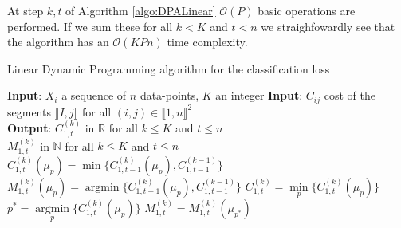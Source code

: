 \documentclass[article,10pt]{llncs}
\begin{document}
At step $k, t$ of Algorithm \ref{algo:DPALinear}  $\mathcal{O}(P)$ basic operations are performed. If we sum these for all $k < K$ and $t < n$  we straighfowardly see that the algorithm has an $\mathcal{O}(KPn)$ time complexity.
\begin{algorithm}
\begin{algorithmic}
\caption{Linear Dynamic Programming algorithm for the classification loss}\label{algo:DPALinear}



    \State \textbf{Input}: $X_i$ a sequence of $n$ data-points, $K$ an integer 
 \State \textbf{Input}: $C_{ij}$ cost of the segments $\rrbracket I, j \rrbracket$  for all $(i, j) \in \llbracket1, n \rrbracket^2$\\
   \State \textbf{Output}: $C^{(k)}_{1,t}$ in $\mathbb{R}$ for all $k \leq K$ and $t \leq n$ \\
    \State $M^{(k)}_{1,t}$ in $\mathbb{N}$ for all $k \leq K$ and $t \leq n$ \\

           \State $C^{(k)}_{1,t}(\mu_p) = \min \{ C^{(k)}_{1,t-1}(\mu_p), C^{(k-1)}_{1,t-1} \}$ 
            \State      $M^{(k)}_{1,t}(\mu_p) = \operatorname{argmin} \{C^{(k)}_{1,t-1}(\mu_p), C^{(k-1)}_{1,t-1} \}$ 
          \EndFor        
           \State $C^{(k)}_{1,t} = \underset{p}{\min} \{ C^{(k)}_{1,t}(\mu_p) \}$ 
	   \State $p^* = \underset{p}{\operatorname{argmin}} \{ C^{(k)}_{1,t}(\mu_p) \}$ 
           \State $M^{(k)}_{1,t} = M^{(k)}_{1,t}( \mu_{{p^*}}) $ 
         \EndFor
    \EndFor
  \end{algorithmic}
\end{algorithm}
\end{document}
